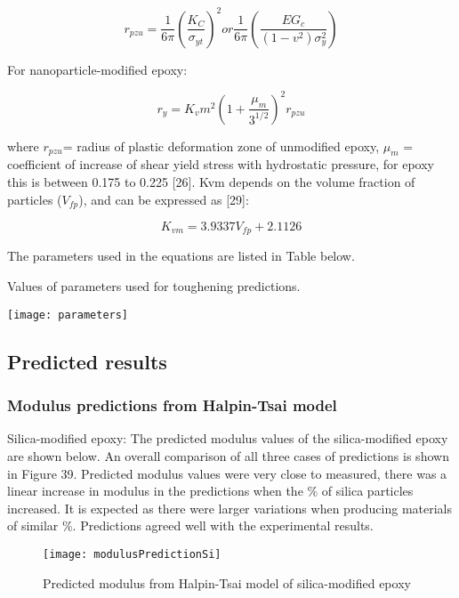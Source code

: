 \documentclass[numbers=noendperiod,chapterprefix=on]{icldt} %
\begin{document}
\begin{equation} 
r_{pzu}=\frac{1}{6π}
\left( \frac {K_C}{\sigma_{yt}}\right) ^2 or \frac {1}{6π}  \left(\frac{EG_c}{(1-v^2)\sigma_y^2}\right) 
\end{equation}

For nanoparticle-modified epoxy: 

\begin{equation}
r_y=K_vm^2
\left(1+\frac {μ_m}{3^{1/2}}\right)^2r_{pzu}
\end{equation}

where $r_{pzu}$= radius of plastic deformation zone of unmodified epoxy, $\mu_m$ = coefficient of increase of shear yield stress with hydrostatic pressure, for epoxy this is between 0.175 to 0.225 [26].
Kvm depends on the volume fraction of particles ($V_{fp}$), and can be expressed as [29]: 

\begin{equation} 
K_{vm}=3.9337V_{fp}+2.1126
\end{equation}

The parameters used in the equations are listed in Table below.

\begin{table}[!htpb]
\centering
\caption{Values of parameters used for toughening predictions.} %
\texttt{[image: parameters]}
\end{table}
\FloatBarrier

\subsection{Predicted results}
\subsubsection{Modulus predictions from Halpin-Tsai model}
Silica-modified epoxy:
\newline
The predicted modulus values of the silica-modified epoxy are shown below. An overall comparison of all three cases of predictions is shown in Figure 39. Predicted modulus values were very close to measured, there was a linear increase in modulus in the predictions when the \% of silica particles increased. It is expected as there were larger variations when producing materials of similar \%. Predictions agreed well with the experimental results. 

\begin{figure}[!htpb]
\centering
\texttt{[image: modulusPredictionSi]}
\caption{Predicted modulus from Halpin-Tsai model of silica-modified epoxy}
\end{figure}
\FloatBarrier
\end{document}
